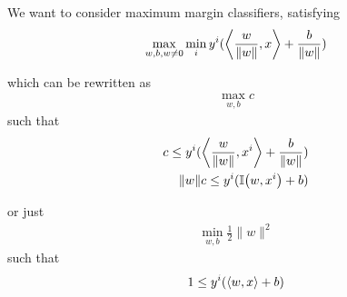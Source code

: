 We want to consider maximum margin classifiers, satisfying
\begin{align}
  \label{eq:92}
  \max_{w, b, w \neq 0} \min_{i} y^{i}(\IP{\frac{w}{\| w \|}, x} +
  \frac{b}{\| w \|})
\end{align}

which can be rewritten as
\begin{align}
  \label{eq:93}
  \max_{w, b} c
\end{align} such that
\begin{align}
  \label{eq:94}
  c \leq y^{i} ( \IP{\frac{w}{\| w \|}, x^{i}} + \frac{b}{\| w \|}) \\
  \| w \| c \leq y^{i} (\I{w, x^{i}} + b) \\
\end{align}

or just
\begin{align}
  \label{eq:95}
  \min_{w, b} \frac{1}{2} \| w \|^{2}
\end{align} such that
\begin{align}
  \label{eq:96}
  1 \leq y^{i} (\IP{w, x} + b)
\end{align}

